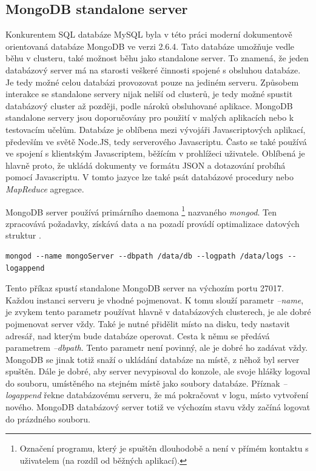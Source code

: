 \subsection{MongoDB standalone server}
Konkurentem SQL databáze MySQL byla v této práci moderní dokumentově orientovaná databáze MongoDB ve verzi 2.6.4.
Tato databáze umožňuje vedle běhu v clusteru, také možnost běhu jako standalone server. To znamená, že jeden databázový server má na starosti veškeré činnosti spojené s obsluhou databáze. Je tedy možné celou databázi provozovat pouze na jediném serveru. Způsobem interakce se standalone servery nijak neliší od clusterů, je tedy možné spustit databázový cluster až později, podle nároků obsluhované aplikace. MongoDB standalone servery jsou doporučovány pro použití v malých aplikacích nebo k testovacím učelům.  Databáze je oblíbena mezi vývojáři Javascriptových aplikací, především ve světě Node.JS, tedy serverového Javascriptu. Často se také používá ve spojení s klientským Javascriptem, běžícím v prohlížeci uživatele. Oblíbená je hlavně proto, že ukládá dokumenty ve formátu JSON a dotazování probíhá pomocí Javascriptu. V tomto jazyce lze také psát databázové procedury \cite{mongoDocs} nebo \emph{MapReduce} agregace.

MongoDB server používá primárního daemona \footnote{Označení programu, který je spuštěn dlouhodobě a není v přímém kontaktu s uživatelem (na rozdíl od běžných aplikací).} nazvaného \emph{mongod}. Ten zpracovává požadavky, získává data a na pozadí provádí optimalizace datových struktur \cite{mongod}.
\begin{lstlisting}[caption={Spuštění MongoDB standalone serveru}]
mongod --name mongoServer --dbpath /data/db --logpath /data/logs --logappend 
\end{lstlisting}
Tento příkaz spustí standalone MongoDB server na výchozím portu 27017.  Každou instanci serveru je vhodné pojmenovat. K tomu slouží parametr \emph{--name}, je zvykem tento parametr používat hlavně v databázových clusterech, je ale dobré pojmenovat server vždy. Také je nutné přidělit místo na disku, tedy nastavit adresář, nad kterým bude databáze operovat. Cesta k němu se předává parametrem \emph{--dbpath}. Tento parametr není povinný, ale je dobré ho zadávat vždy. MongoDB se jinak totiž snaží o ukládání databáze na místě, z něhož byl server spuštěn. Dále je dobré, aby server nevypisoval do konzole, ale svoje hlášky logoval do souboru, umístěného na stejném místě jako soubory databáze. Příznak \emph{--logappend} řekne databázovému serveru, že má pokračovat v logu, místo vytvoření nového. MongoDB databázový server totiž ve výchozím stavu vždy začíná logovat do prázdného souboru. 

